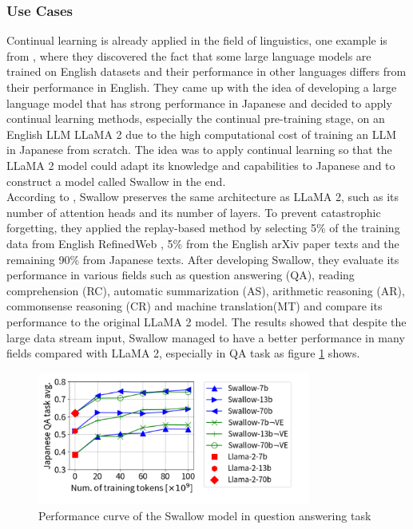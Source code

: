 \documentclass[runningheads]{llncs}
\begin{document}
\subsubsection{Use Cases}
\noindent \newline
Continual learning is already applied in the field of linguistics, one example is from \cite{Fujii24}, where they discovered the fact that some large language models are trained on English datasets and their performance 
in other languages differs from their performance in English. They came up with the idea of developing a large language model that has strong performance in Japanese and decided to apply continual learning methods, especially 
the continual pre-training stage, on an English LLM LLaMA 2 due to the high computational cost of training an LLM in Japanese from scratch. The idea was to apply continual learning so that the LLaMA 2 model could adapt its knowledge 
and capabilities to Japanese and to construct a model called Swallow in the end. \\
\noindent \newline
According to \cite{Fujii24}, Swallow preserves the same architecture as LLaMA 2, such as its number of attention heads and its number of layers. To prevent catastrophic forgetting, they applied the replay-based method
by selecting 5\% of the training data from English RefinedWeb \cite{Penedo23}, 5\% from the English arXiv paper texts and the remaining 90\% from Japanese texts. After developing Swallow, they evaluate its performance in various fields such
as question answering (QA), reading comprehension (RC), automatic summarization (AS), arithmetic reasoning (AR), commonsense reasoning (CR) and machine translation(MT) and compare its performance to the original LLaMA 2 model.
The results showed that despite the large data stream input, Swallow managed to have a better performance in many fields compared with LLaMA 2, especially in QA task as figure \ref{fig:swallow} shows.
\begin{figure}[H]
  \centering
  \includegraphics[width=0.8\textwidth]{swallow.png}
  \caption{Performance curve of the Swallow model in question answering task \cite{Fujii24}}
  \label{fig:swallow}
\end{figure}
\end{document}
